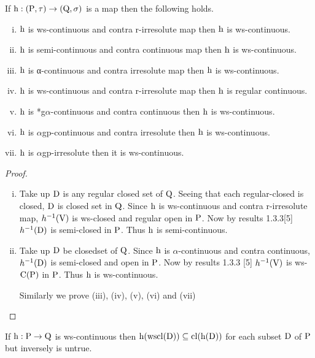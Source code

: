 \begin{thm}\label{thm3.2.16}
If $\mathrm{h}: (\mathrm{P},\tau )\to (\mathrm{Q}, \sigma)$ is a map then the following holds.
\begin{enumerate}[(i)]
\item $\mathrm{h}$ is ws-continuous and contra r-irresolute map then $\mathrm{h}$ is ws-continuous.
\item $\mathrm{h}$ is semi-continuous and contra continuous map then $\mathrm{h}$ is ws-continuous.
\item $\mathrm{h}$ is α-continuous and contra irresolute map then $\mathrm{h}$ is ws-continuous.
\item $\mathrm{h}$ is ws-continuous and contra r-irresolute map then $\mathrm{h}$ is regular continuous.
\item $\mathrm{h}$ is *g$\alpha$-continuous and contra continuous then $\mathrm{h}$ is ws-continuous.
\item $\mathrm{h}$ is $\alpha$gp-continuous and contra irresolute then $\mathrm{h}$ is ws-continuous.
\item $\mathrm{h}$ is $\alpha$gp-irresolute then it is ws-continuous.
\end{enumerate}
\end{thm}

\begin{proof}
\begin{enumerate}[(i)]
\item Take up $\mathrm{D}$ is any regular closed set of $\mathrm{Q}$. Seeing that each regular-closed is closed, $\mathrm{D}$ is closed set in $\mathrm{Q}$. Since $\mathrm{h}$ is ws-continuous and contra r-irresolute map, $h^{-1} (\mathrm{V})$ is ws-closed and regular open in $\mathrm{P}$. Now by results 1.3.3[5] $h^{-1} (\mathrm{D})$ is semi-closed in $\mathrm{P}$. Thus $\mathrm{h}$ is semi-continuous.

\item Take up $\mathrm{D}$ be closedset of $\mathrm{Q}$. Since $\mathrm{h}$ is $\alpha$-continuous and contra continuous, $h^{-1} (\mathrm{D})$ is semi-closed and open in $\mathrm{P}$. Now by results 1.3.3 [5] $h^{-1} (\mathrm{V})$ is ws-$\mathrm{C}(\mathrm{P})$ in $\mathrm{P}$. Thus $\mathrm{h}$ is ws-continuous.

Similarly we prove (iii), (iv), (v), (vi) and (vii)
\end{enumerate}
\end{proof}

\begin{thm}\label{thm3.2.17}
If $\mathrm{h}: \mathrm{P}\to \mathrm{Q}$ is ws-continuous then $\mathrm{h}(\mathrm{wscl}(\mathrm{D}))\subseteq \mathrm{cl}(\mathrm{h}(\mathrm{D}))$ for each subset $\mathrm{D}$ of $\mathrm{P}$ but inversely is untrue.
\end{thm}

